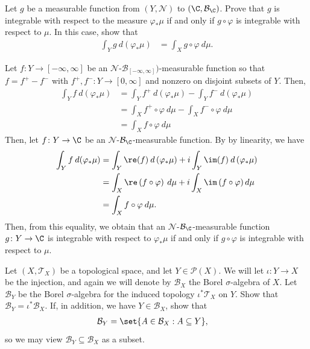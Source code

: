 \documentclass[10pt]{mypackage}
\begin{document}
\begin{problem}
  Let $g$ be a measurable function from $\left( Y,\mathcal{N} \right)$ to $\left( \C,\mathcal{B}_{\C} \right)$. Prove that $g$ is integrable with respect to the measure $\varphi_{\ast}\mu$ if and only if $g\circ\varphi$ is integrable with respect to $\mu$. In this case, show that
  \begin{align*}
    \int_{Y}^{} g\:d\left(\varphi_{\ast}\mu\right) &= \int_{X}^{} g\circ\varphi\:d\mu.
  \end{align*}
\end{problem}
\begin{solution}
  Let $f\colon Y\rightarrow[-\infty,\infty]$ be an $\mathcal{N}$-$\mathcal{B}_{[-\infty,\infty]})$-measurable function so that $f=f^+-f^-$ with $f^+,f^-\colon Y\rightarrow[0,\infty]$ and nonzero on disjoint subsets of $Y$. Then,  
  \begin{align*}
    \int_Yf\:d\left(\varphi_{\ast}\mu\right)&=\int_Y f^+\:d\left(\varphi_{\ast}\mu\right)-\int_Y f^-\:d\left(\varphi_{\ast}\mu\right)\\
                                            &=\int_X f^+\circ\varphi\:d\mu-\int_Xf^-\circ\varphi\:d\mu\\
                                            &=\int_Xf\circ\varphi\:d\mu
  \end{align*}
  Then, let $f\colon Y\rightarrow\C$ be an $\mathcal{N}$-$\mathcal{B}_{\C}$-measurable function. By by linearity, we have 
  \begin{align*}
    \int_Y f\:d(\varphi_*\mu)&=\int_Y\re(f)\:d\left(\varphi_{\ast}\mu\right)+i\int_Y\im(f)\:d\left(\varphi_{\ast}\mu\right)\\
                             &=\int_X\re\left(f\circ\varphi\right)\:d\mu+i\int_X\im\left(f\circ\varphi\right)d\mu\\
                             &=\int_Xf\circ\varphi\:d\mu.
  \end{align*}
  Then, from this equality, we obtain that an $\mathcal{N}$-$\mathcal{B}_{\C}$-measurable function $g\colon Y\rightarrow\C$ is integrable with respect to $\varphi_{\ast}\mu$ if and only if $g\circ\varphi$ is integrable with respect to $\mu$.
\end{solution}
\begin{problem}
  Let $\left( X,\mathcal{T}_X \right)$ be a topological space, and let $Y\in \mathcal{P}(X)$. We will let $\iota\colon Y\to X$ be the injection, and again we will denote by $\mathcal{B}_X$ the Borel $\sigma$-algebra of $X$. Let $\mathcal{B}_Y$ be the Borel $\sigma$-algebra for the induced topology $\iota^{\ast}\mathcal{T}_X$ on $Y$. Show that $\mathcal{B}_Y = \iota^{\ast}\mathcal{B}_X$. If, in addition, we have $Y\in \mathcal{B}_X$, show that
  \begin{align*}
    \mathcal{B}_Y &= \set{A\in \mathcal{B}_X : A\subseteq Y},
  \end{align*}
  so we may view $\mathcal{B}_Y\subseteq \mathcal{B}_X$ as a subset.
\end{problem}
\end{document}
